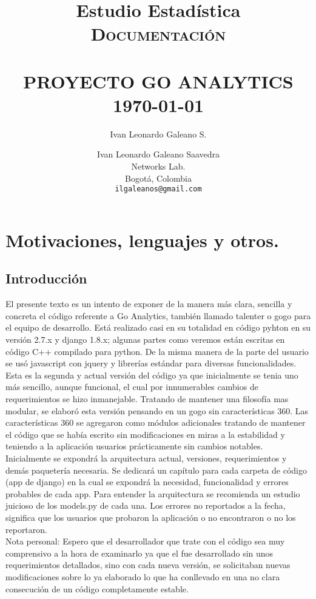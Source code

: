 \documentclass[10pt,a4paper]{book}
\author{Ivan Leonardo Galeano S.}
\title{Estudio Estadística}
\title{	\normalsize \textsc{Documentación}
	\\[2.0cm]
	\HRule{0.5pt} \\
	\LARGE \textbf{\uppercase{Proyecto Go Analytics}}
	\HRule{2pt} \\ [0.5cm]
	\normalsize \today
}
\author{
	Ivan Leonardo Galeano Saavedra\\
	Networks Lab.\\
	Bogotá, Colombia\\
	\texttt{ilgaleanos@gmail.com} \\
}
\makeatletter
\def\printtitle{
	{\centering \@title\par}}
\def\printauthor{
	{\centering \large \@author}}
\makeatother
\begin{document}
	\thispagestyle{empty}
	\printtitle
	\vfill
	\printauthor

	\tableofcontents

	\chapter{Motivaciones, lenguajes y otros.}

	\section*{Introducción}
	
	El presente texto es un intento de exponer de la manera más clara, sencilla y concreta el código referente a Go Analytics, también llamado talenter o gogo para el equipo de desarrollo. Está realizado casi en su totalidad en código pyhton en su versión 2.7.x y django 1.8.x; algunas partes como veremos están escritas en código C++ compilado para python. De la misma manera de la parte del usuario se usó javascript con jquery y librerías estándar para diversas funcionalidades.\\
	
	Esta es la segunda y actual versión del código ya que inicialmente se tenia uno más sencillo, aunque funcional, el cual por innumerables cambios de requerimientos se hizo inmanejable. Tratando de mantener una filosofía mas modular, se elaboró esta versión pensando en un gogo sin características 360. Las características 360 se agregaron como módulos adicionales tratando de mantener el código que se había escrito sin modificaciones en miras a la estabilidad y teniendo a la aplicación usuarios prácticamente sin cambios notables.\\
	
	Inicialmente se expondrá la arquitectura actual, versiones, requerimientos y demás paquetería necesaria. Se dedicará un capítulo para cada carpeta de código (app de django) en la cual se expondrá la necesidad, funcionalidad y errores probables de cada app. Para entender la arquitectura se recomienda un estudio juicioso de los models.py de cada una. Los errores no reportados a la fecha, significa que los usuarios que probaron la aplicación o no encontraron o no los reportaron.\\

	Nota personal: Espero que el desarrollador que trate con el código sea muy comprensivo a la hora de examinarlo ya que el fue desarrollado sin unos requerimientos detallados, sino con cada nueva versión, se solicitaban nuevas modificaciones sobre lo ya elaborado lo que ha conllevado en una no clara consecución de un código completamente estable.\\
\end{document}
